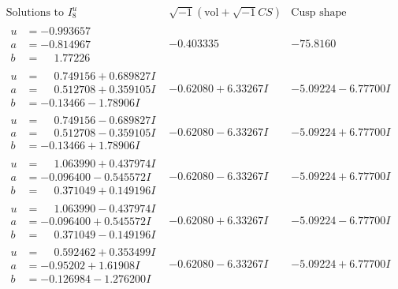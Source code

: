 \documentclass[1p]{elsarticle_modified}
\theoremstyle{definition}
\newcommand{\I}{\sqrt{-1}}
\begin{document}
$$\begin{array}{c|c|c}  
\text{Solutions to }I^u_{8}& \I (\text{vol} + \sqrt{-1}CS) & \text{Cusp shape}\\
 \hline 
\begin{aligned}
u &= -0.993657\phantom{ +0.000000I} \\
a &= -0.814967\phantom{ +0.000000I} \\
b &= \phantom{-}1.77226\phantom{ +0.000000I}\end{aligned}
 & -0.403335\phantom{ +0.000000I} & -75.8160\phantom{ +0.000000I} \\ \hline\begin{aligned}
u &= \phantom{-}0.749156 + 0.689827 I \\
a &= \phantom{-}0.512708 + 0.359105 I \\
b &= -0.13466 - 1.78906 I\end{aligned}
 & -0.62080 + 6.33267 I & -5.09224 - 6.77700 I \\ \hline\begin{aligned}
u &= \phantom{-}0.749156 - 0.689827 I \\
a &= \phantom{-}0.512708 - 0.359105 I \\
b &= -0.13466 + 1.78906 I\end{aligned}
 & -0.62080 - 6.33267 I & -5.09224 + 6.77700 I \\ \hline\begin{aligned}
u &= \phantom{-}1.063990 + 0.437974 I \\
a &= -0.096400 - 0.545572 I \\
b &= \phantom{-}0.371049 + 0.149196 I\end{aligned}
 & -0.62080 - 6.33267 I & -5.09224 + 6.77700 I \\ \hline\begin{aligned}
u &= \phantom{-}1.063990 - 0.437974 I \\
a &= -0.096400 + 0.545572 I \\
b &= \phantom{-}0.371049 - 0.149196 I\end{aligned}
 & -0.62080 + 6.33267 I & -5.09224 - 6.77700 I \\ \hline\begin{aligned}
u &= \phantom{-}0.592462 + 0.353499 I \\
a &= -0.95202 + 1.61908 I \\
b &= -0.126984 - 1.276200 I\end{aligned}
 & -0.62080 - 6.33267 I & -5.09224 + 6.77700 I \\ \hline\begin{aligned}

\end{aligned}
\end{array}$$
\end{document}
